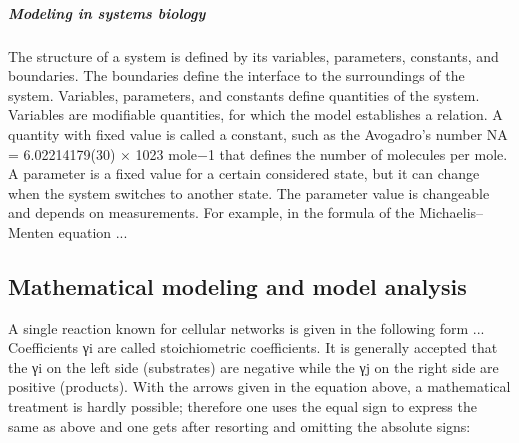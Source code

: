 \subparagraph{Modeling in systems biology}
The structure of a system is defined by its variables, parameters, constants, and
boundaries. The boundaries define the interface to the surroundings of the system.
Variables, parameters, and constants define quantities of the system. Variables
are modifiable quantities, for which the model establishes a relation. A quantity
with fixed value is called a constant, such as the Avogadro’s number NA =
6.02214179(30) × 1023 mole−1 that defines the number of molecules per mole.
A parameter is a fixed value for a certain considered state, but it can change when
the system switches to another state. The parameter value is changeable and depends
on measurements. For example, in the formula of the Michaelis–Menten equation ...

\subsection{Mathematical modeling and model analysis}
A single reaction known for cellular networks is given in the following form ... Coefficients γi are called stoichiometric coefficients. It is generally accepted that the γi on the left side (substrates) are negative while the γj on the right side are positive (products). With the arrows given in the equation above, a mathematical treatment is hardly possible; therefore one uses the equal sign to express the same as above and one gets after resorting and omitting the absolute signs:

